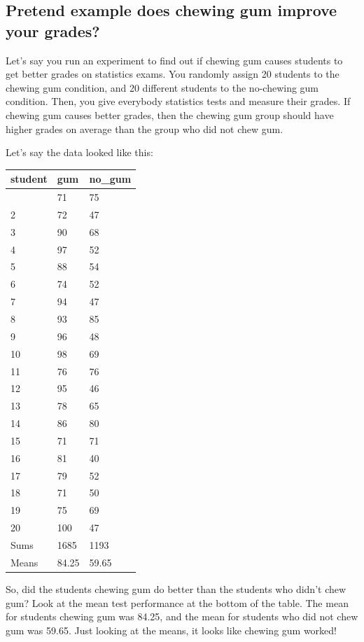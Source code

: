 \documentclass[
  letterpaper,
  DIV=11,
  numbers=noendperiod]{scrreprt}
\begin{document}
\subsection{Pretend example does chewing gum improve your
grades?}\label{pretend-example-does-chewing-gum-improve-your-grades}

Let's say you run an experiment to find out if chewing gum causes
students to get better grades on statistics exams. You randomly assign
20 students to the chewing gum condition, and 20 different students to
the no-chewing gum condition. Then, you give everybody statistics tests
and measure their grades. If chewing gum causes better grades, then the
chewing gum group should have higher grades on average than the group
who did not chew gum.

Let's say the data looked like this:

\begin{longtable}[]{@{}lll@{}}
\toprule\noalign{}
student & gum & no\_gum \\
\midrule\noalign{}
\endhead
\bottomrule\noalign{}
\endlastfoot
1 & 71 & 75 \\
2 & 72 & 47 \\
3 & 90 & 68 \\
4 & 97 & 52 \\
5 & 88 & 54 \\
6 & 74 & 52 \\
7 & 94 & 47 \\
8 & 93 & 85 \\
9 & 96 & 48 \\
10 & 98 & 69 \\
11 & 76 & 76 \\
12 & 95 & 46 \\
13 & 78 & 65 \\
14 & 86 & 80 \\
15 & 71 & 71 \\
16 & 81 & 40 \\
17 & 79 & 52 \\
18 & 71 & 50 \\
19 & 75 & 69 \\
20 & 100 & 47 \\
Sums & 1685 & 1193 \\
Means & 84.25 & 59.65 \\
\end{longtable}

So, did the students chewing gum do better than the students who didn't
chew gum? Look at the mean test performance at the bottom of the table.
The mean for students chewing gum was 84.25, and the mean for students
who did not chew gum was 59.65. Just looking at the means, it looks like
chewing gum worked!
\end{document}
